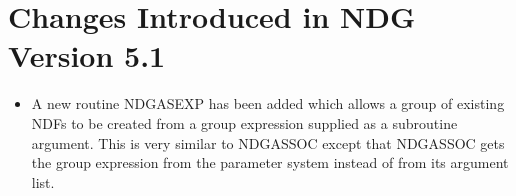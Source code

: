 \documentclass[twoside,11pt]{article}
\renewcommand{\_}{\texttt{\symbol{95}}}
\begin{document}
\section{Changes Introduced in NDG Version 5.1}
\begin{itemize}
   \item A new routine NDG\_ASEXP has been added which allows a group of
         existing NDFs to be created from a group expression supplied as 
         a subroutine argument. This is very similar to NDG\_ASSOC except
         that NDG\_ASSOC gets the group expression from the parameter system
         instead of from its argument list.
\end{itemize}
\end{document}
